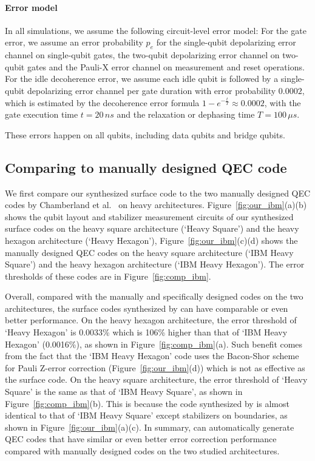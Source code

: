 \paragraph{Error model} In all simulations, we assume the following circuit-level error model:
For the gate error, we assume an error probability $p_e$ for the single-qubit depolarizing error channel on single-qubit gates, the two-qubit depolarizing error channel on two-qubit gates and the Pauli-X error channel on measurement and reset operations. For the idle decoherence error, we assume each idle qubit is followed by a single-qubit depolarizing error channel per gate duration 
with error probability $0.0002$, which is estimated by the decoherence error formula $1-e^{-\frac{t}{T}} \approx 0.0002$, with the gate execution time $t= 20\,n s$  and the relaxation or dephasing time $T= 100\,\mu s$. %

These errors happen on all qubits, including data qubits and bridge qubits.


\subsection{Comparing to manually designed QEC code}

We first compare our synthesized surface code to the two manually designed QEC codes by Chamberland et al.~\cite{Chamberland2020TopologicalAS} on 
heavy architectures.
Figure~\ref{fig:our_ibm}(a)(b) shows the qubit layout and stabilizer measurement circuits of our synthesized surface codes on the heavy square architecture (`\myCompilerNameSpace Heavy Square')  and the heavy hexagon architecture (`\myCompilerNameSpace Heavy Hexagon'),
Figure~\ref{fig:our_ibm}(c)(d) shows the manually designed QEC codes on the heavy square architecture (`IBM Heavy Square') and  the heavy hexagon architecture (`IBM Heavy Hexagon'). 
The error thresholds of these codes are in  Figure~\ref{fig:comp_ibm}.

Overall, compared with the manually and specifically designed codes on the two architectures, the surface codes synthesized by \myCompilerNameSpace can have comparable or even better performance.
On the heavy hexagon architecture, the error threshold of `\myCompilerNameSpace Heavy Hexagon' is 0.0033\% which is 106\% higher than that of `IBM Heavy Hexagon' (0.0016\%), as shown in Figure~\ref{fig:comp_ibm}(a).
Such benefit comes from the fact that the `IBM Heavy Hexagon' code uses the Bacon-Shor scheme for Pauli Z-error correction (Figure~\ref{fig:our_ibm}(d)) which is not as effective as the surface code. %
On the heavy square architecture, the error threshold of `\myCompilerNameSpace Heavy Square' is the same as that of `IBM Heavy Square', as shown in Figure~\ref{fig:comp_ibm}(b).  This is because the code synthesized by \myCompilerNameSpace is 
 almost identical to that of `IBM Heavy Square' except stabilizers on boundaries, as shown in Figure~\ref{fig:our_ibm}(a)(c). %
In summary, \myCompilerNameSpace can automatically generate QEC codes that have similar or even better error correction performance compared with manually designed codes on the two studied architectures.

